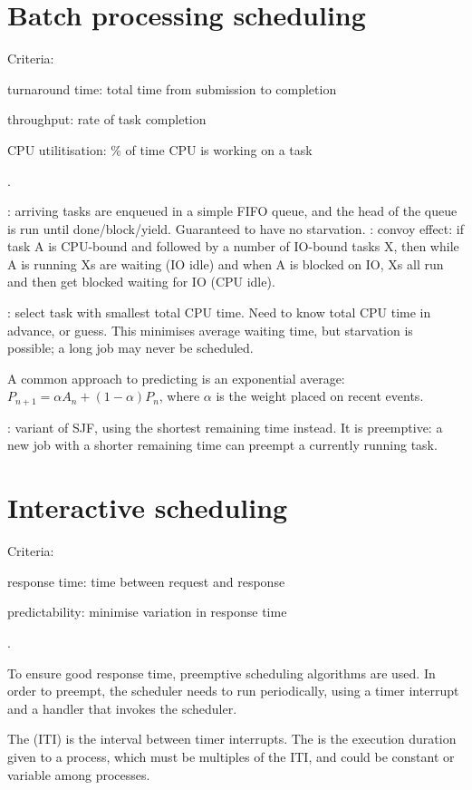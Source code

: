 \documentclass[fontsize=9pt]{slnotes}
\newcommand\problems{\textsymbol{✗}}
\begin{document}
\section{Batch processing scheduling}
Criteria: \begin{slinenum}
\item turnaround time: total time from submission to completion
\item throughput: rate of task completion
\item CPU utilitisation: \% of time CPU is working on a task
\end{slinenum}.

: arriving tasks are enqueued in a simple FIFO queue, and the head of the queue is run until done/block/yield. Guaranteed to have no starvation. \problems: convoy effect: if task A is CPU-bound and followed by a number of IO-bound tasks X, then while A is running Xs are waiting (IO idle) and when A is blocked on IO, Xs all run and then get blocked waiting for IO (CPU idle).

: select task with smallest total CPU time. Need to know total CPU time in advance, or guess. This minimises average waiting time, but starvation is possible; a long job may never be scheduled.

A common approach to predicting is an exponential average: \(P_{n+1} = \alpha A_n + (1-\alpha) P_n\), where \(\alpha\) is the weight placed on recent events.

: variant of SJF, using the shortest remaining time instead. It is preemptive: a new job with a shorter remaining time can preempt a currently running task.

\section{Interactive scheduling}
Criteria: \begin{slinenum}
\item response time: time between request and response
\item predictability: minimise variation in response time
\end{slinenum}.

To ensure good response time, preemptive scheduling algorithms are used. In order to preempt, the scheduler needs to run periodically, using a timer interrupt and a handler that invokes the scheduler.

The  (ITI) is the interval between timer interrupts. The  is the execution duration given to a process, which must be multiples of the ITI, and could be constant or variable among processes.
\end{document}
